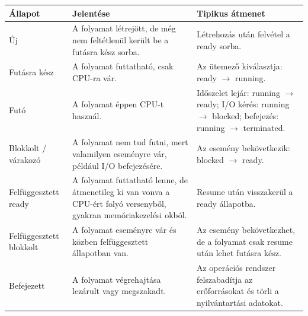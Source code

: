 \small
\begin{tabularx}{\textwidth}{L{32mm}X X}
\toprule
\textbf{Állapot} & \textbf{Jelentése} & \textbf{Tipikus átmenet} \\
\midrule
Új & A folyamat létrejött, de még nem feltétlenül került be a futásra kész sorba. & Létrehozás után felvétel a ready sorba. \\
Futásra kész & A folyamat futtatható, csak CPU-ra vár. & Az ütemező kiválasztja: ready $\rightarrow$ running. \\
Futó & A folyamat éppen CPU-t használ. & Időszelet lejár: running $\rightarrow$ ready; I/O kérés: running $\rightarrow$ blocked; befejezés: running $\rightarrow$ terminated. \\
Blokkolt / várakozó & A folyamat nem tud futni, mert valamilyen eseményre vár, például I/O befejezésére. & Az esemény bekövetkezik: blocked $\rightarrow$ ready. \\
Felfüggesztett ready & A folyamat futtatható lenne, de átmenetileg ki van vonva a CPU-ért folyó versenyből, gyakran memóriakezelési okból. & Resume után visszakerül a ready állapotba. \\
Felfüggesztett blokkolt & A folyamat eseményre vár és közben felfüggesztett állapotban van. & Az esemény bekövetkezhet, de a folyamat csak resume után lehet futásra kész. \\
Befejezett & A folyamat végrehajtása lezárult vagy megszakadt. & Az operációs rendszer felszabadítja az erőforrásokat és törli a nyilvántartási adatokat. \\
\bottomrule
\end{tabularx}
